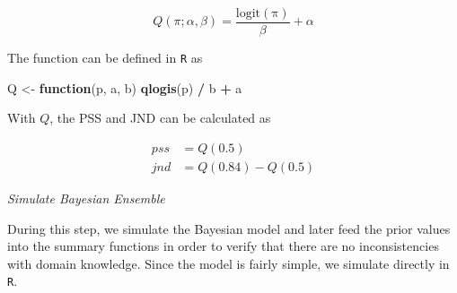 \documentclass[11pt, oneside, openany]{scrbook}
\newenvironment{Shaded}{\begin{snugshade}}{\end{snugshade}}
\newcommand{\ControlFlowTok}[1]{\textcolor[rgb]{0.13,0.29,0.53}{\textbf{#1}}}
\newcommand{\DataTypeTok}[1]{\textcolor[rgb]{0.13,0.29,0.53}{#1}}
\newcommand{\DecValTok}[1]{\textcolor[rgb]{0.00,0.00,0.81}{#1}}
\newcommand{\FloatTok}[1]{\textcolor[rgb]{0.00,0.00,0.81}{#1}}
\newcommand{\KeywordTok}[1]{\textcolor[rgb]{0.13,0.29,0.53}{\textbf{#1}}}
\newcommand{\NormalTok}[1]{#1}
\newcommand{\OperatorTok}[1]{\textcolor[rgb]{0.81,0.36,0.00}{\textbf{#1}}}
\newcommand{\OtherTok}[1]{\textcolor[rgb]{0.56,0.35,0.01}{#1}}
\newcommand{\StringTok}[1]{\textcolor[rgb]{0.31,0.60,0.02}{#1}}
\begin{document}
\begin{equation}
  Q(\pi; \alpha, \beta) = \frac{\mathrm{logit(\pi)}}{\beta} + \alpha
  \label{eq:summfun1}
\end{equation}

The function can be defined in \texttt{R} as

\begin{Shaded}
\begin{Highlighting}[]
\NormalTok{Q <-}\StringTok{ }\ControlFlowTok{function}\NormalTok{(p, a, b) }\KeywordTok{qlogis}\NormalTok{(p) }\OperatorTok{/}\StringTok{ }\NormalTok{b }\OperatorTok{+}\StringTok{ }\NormalTok{a}
\end{Highlighting}
\end{Shaded}

With \(Q\), the PSS and JND can be calculated as


\begin{align*}
  pss &= Q(0.5) \\
  jnd &= Q(0.84) - Q(0.5)
\end{align*}

\emph{Simulate Bayesian Ensemble}

During this step, we simulate the Bayesian model and later feed the prior values into the summary functions in order to verify that there are no inconsistencies with domain knowledge. Since the model is fairly simple, we simulate directly in \texttt{R}.


\begin{Shaded}
\end{Shaded}
\end{document}
